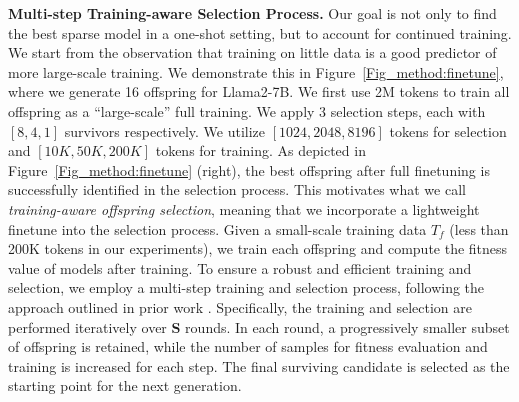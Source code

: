 \noindent \textbf{Multi-step Training-aware Selection Process.} Our goal is not only to find the best sparse model in a one-shot setting, but to account for continued training. We start from the observation that training on little data is a good predictor of more large-scale training. We demonstrate this in Figure~\ref{Fig_method:finetune}, where we generate 16 offspring for Llama2-7B. We first use 2M tokens to train all offspring as a ``large-scale'' full training. We apply 3 selection steps, each with $[8, 4, 1]$ survivors respectively. We utilize $[1024, 2048, 8196]$ tokens for selection and $[10K, 50K, 200K]$ tokens for training. As depicted in Figure~\ref{Fig_method:finetune} (right), the best offspring after full finetuning is successfully identified in the selection process. This motivates what we call \emph{training-aware offspring selection}, meaning that we incorporate a lightweight finetune into the selection process. Given a small-scale training data $T_f$ (less than 200K tokens in our experiments), we train each offspring and compute the fitness value of models after training. To ensure a robust and efficient training and selection, we employ a multi-step training and selection process, following the approach outlined in prior work \citep{sieberling2024evopress}. Specifically, the training and selection are performed iteratively over $\bm S$ rounds. In each round, a progressively smaller subset of offspring is retained, while the number of samples for fitness evaluation and training is increased for each step. The final surviving candidate is selected as the starting point for the next generation. 